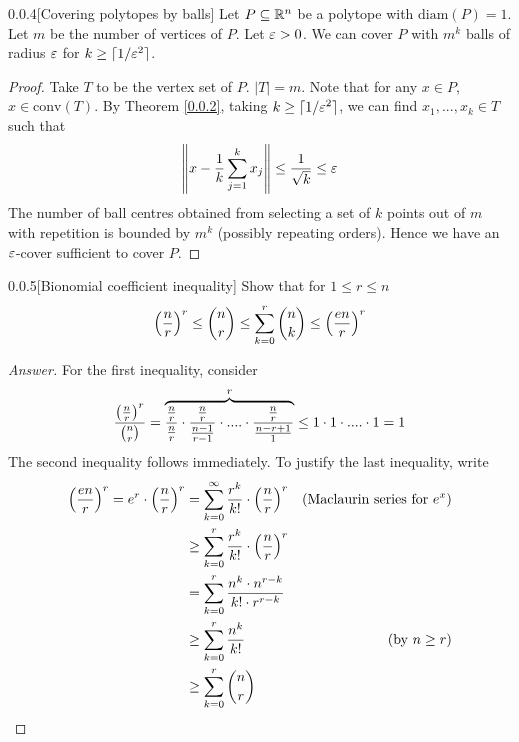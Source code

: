
\begin{cor}{0.0.4}[Covering polytopes by balls]\label{0.0.4}
Let $P \subseteq \mathbb{R}^n$ be a polytope with $\text{diam}(P) = 1$. Let $m$ be the number of vertices of $P$. Let $\varepsilon >0$.
We can cover $P$ with $m^k$ balls of radius $\varepsilon$ for $k \geq \lceil 1/\varepsilon^2 \rceil$.
\end{cor}

\begin{proof}
Take $T$ to be the vertex set of $P$. $|T| = m$. Note that for any $x\in P$, $x \in \text{conv}(T)$.
By Theorem \ref{0.0.2}, taking $k \geq \lceil 1/\varepsilon^2\rceil$, we can find $x_1,...,x_k \in T$ such that
\begin{align*}
    \left\|x - \frac1k\sum_{j=1}^k x_j\right\| \leq \frac1 {\sqrt k} \leq \varepsilon 
\end{align*}
The number of ball centres obtained from selecting a set of $k$ points out of $m$ with repetition is bounded by $m^k$ (possibly repeating orders).
Hence we have an $\varepsilon$-cover sufficient to cover $P$.
\end{proof}

\begin{ex}{0.0.5}[Bionomial coefficient inequality]\label{0.0.5}
Show that for $1 \leq r \leq n$
\begin{align*}
    \left(\frac n r \right)^r \leq \binom{n}{r} \leq \sum_{k=0}^r \binom{n}{k} \leq \left(\frac{en}r\right)^r
\end{align*}
\end{ex}

\begin{proof}[Answer] 
For the first inequality, consider
\begin{align*}
    \frac{\left(\frac n r \right)^r}{\binom{n}{r}} = {\overbrace{\frac{\frac n r}{\frac n r}\cdot \frac{\frac n r}{\frac {n-1} {r-1}} \cdot .... \cdot \frac{\frac n r}{\frac {n-r+1} 1}}^r}
    \leq 1 \cdot 1 \cdot .... \cdot 1 = 1
\end{align*}
The second inequality follows immediately. To justify the last inequality, write
\begin{align*}
    \left(\frac {en} {r}\right)^r = e^r \cdot \left(\frac n r\right)^r &= \sum_{k=0}^\infty \frac {r^k} {k!} \cdot \left(\frac n r\right)^r &\text{(Maclaurin series for $e^x$)} \\
    &\geq \sum_{k=0}^r \frac {r^k} {k!} \cdot \left(\frac n r\right)^r \\
    &= \sum_{k=0}^r \frac {n^k \cdot n^{r-k}} {k! \cdot r^{r-k}} \\
    &\geq \sum_{k=0}^r \frac {n^k } {k!} &\text{(by $n \geq r$)}\\
    &\geq \sum_{k=0}^r \binom{n}{r}
\end{align*}
\end{proof}

